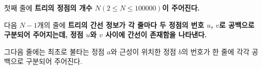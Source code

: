 첫째 줄에 \bf{트리}의 정점의 개수 $N$$(2 ≤ N ≤ 100000)$이 주어진다.


다음 $N-1$개의 줄에 \bf{트리}의 간선 정보가 각 줄마다 두 정점의 번호 $u$, $v$로 공백으로 구분되어 주어지는데, 정점 $u$와 $v$ 사이에 간선이 존재함을 나타낸다.


그다음 줄에는 최초로 불타는 정점 $a$와 근성이 위치한 정점 $b$의 번호가 한 줄에 각각 공백으로 구분되어 주어진다.
